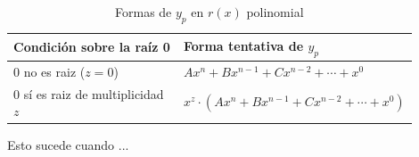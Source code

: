 \begin{table}[H]
\centering
\caption{Formas de $y_{p}$ en $r(x)$ polinomial}
\label{tab:eq_polinomial}
\begin{threeparttable}
{
\begin{tabular}{p{0.45\linewidth}p{0.45\linewidth}}\hline

    \textbf{Condición sobre la raíz 0} & \textbf{Forma tentativa de $y_{p}$} \\ \hline

    0 no es raiz ($z=0$) & $Ax^{n} + Bx^{n-1}+ Cx^{n-2} + \cdots + x^{0}$ \\
    0 sí es raiz de multiplicidad $z$\tnote{1} & $x^{z} \cdot (Ax^{n} + Bx^{n-1}+ Cx^{n-2} + \cdots + x^{0})$ \\
    
    \hline
\end{tabular}
}
\begin{tablenotes} %
    \item[1] Esto sucede cuando ...
\end{tablenotes}
\end{threeparttable}
\end{table}
